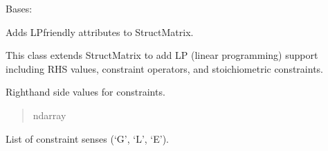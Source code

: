 \documentclass[letterpaper,12pt,english]{sphinxmanual}
\begin{document}
\begin{fulllineitems}
\label{\detokenize{api/core:cbmpy.CBCommon.StructMatrixLP}}
\pysigstartsignatures
\pysiglinewithargsret
{}
{\sphinxparamcomma {}\sphinxparamcomma {}\sphinxparamcomma {}\sphinxparamcomma {}\sphinxparamcomma {}\sphinxparamcomma {}}
{}
\pysigstopsignatures
\sphinxAtStartPar
Bases: {\hyperref[\detokenize{api/core:cbmpy.CBCommon.StructMatrix}]{}}

\sphinxAtStartPar
Adds LP\sphinxhyphen{}friendly attributes to StructMatrix.

\sphinxAtStartPar
This class extends StructMatrix to add LP (linear programming) support
including RHS values, constraint operators, and stoichiometric constraints.

\begin{fulllineitems}
\label{\detokenize{api/core:cbmpy.CBCommon.StructMatrixLP.RHS}}
\pysigstartsignatures
\pysigline
{}
\pysigstopsignatures
\sphinxAtStartPar
Right\sphinxhyphen{}hand side values for constraints.
\begin{quote}\begin{description}
\sphinxAtStartPar
ndarray

\end{description}\end{quote}

\end{fulllineitems}


\begin{fulllineitems}
\label{\detokenize{api/core:cbmpy.CBCommon.StructMatrixLP.operators}}
\pysigstartsignatures
\pysigline
{}
\pysigstopsignatures
\sphinxAtStartPar
List of constraint senses (‘G’, ‘L’, ‘E’).
\begin{quote}\begin{description}
\sphinxAtStartPar
{}


\end{description}
\end{quote}
\end{fulllineitems}
\end{fulllineitems}
\end{document}
